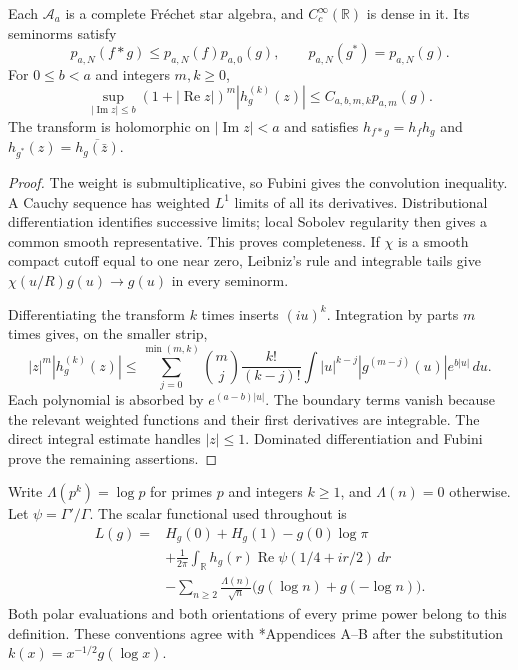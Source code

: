 \begin{lemma}
Each $\mathcal A_a$\label{nwc:lem:tests} is a complete Fr\'echet star algebra, and
$C_c^\infty(\mathbb R)$ is dense in it. Its seminorms satisfy
\[
 p_{a,N}(f*g)\leq p_{a,N}(f)p_{a,0}(g),\qquad
 p_{a,N}(g^*)=p_{a,N}(g).
\]
For $0\leq b<a$ and integers $m,k\geq0$,
\begin{equation}\label{nwc:eq:strip}
 \sup_{|\operatorname{Im}z|\leq b}
 (1+|\operatorname{Re}z|)^m|h_g^{(k)}(z)|
 \leq C_{a,b,m,k}p_{a,m}(g).
\end{equation}
The transform is holomorphic on $|\operatorname{Im}z|<a$ and satisfies
$h_{f*g}=h_fh_g$ and $h_{g^*}(z)=\overline{h_g(\bar z)}$.
\end{lemma}
\begin{proof}
The weight is submultiplicative, so Fubini gives the convolution
inequality. A Cauchy sequence has weighted $L^1$ limits of all its
derivatives. Distributional differentiation identifies successive
limits; local Sobolev regularity then gives a common smooth
representative. This proves completeness.
If $\chi$ is a smooth compact cutoff equal to one near zero,
Leibniz's rule and integrable tails give $\chi(u/R)g(u)\to g(u)$ in
every seminorm.

Differentiating the transform $k$ times inserts $(iu)^k$.
Integration by parts $m$ times gives, on the smaller strip,
\[
 |z|^m|h_g^{(k)}(z)|\leq
 \sum_{j=0}^{\min(m,k)}\binom mj\frac{k!}{(k-j)!}
 \int |u|^{k-j}|g^{(m-j)}(u)|e^{b|u|}\,du.
\]
Each polynomial is absorbed by $e^{(a-b)|u|}$.
The boundary terms vanish because the relevant weighted functions and
their first derivatives are integrable. The direct integral estimate
handles $|z|\leq1$. Dominated differentiation and Fubini prove the
remaining assertions.
\end{proof}

Write $\Lambda(p^k)=\log p$ for primes $p$ and integers $k\geq1$,
and $\Lambda(n)=0$ otherwise. Let $\psi=\Gamma'/\Gamma$.
The scalar functional used throughout is
\begin{equation}\label{nwc:eq:weil}
\begin{aligned}
 L(g)={}&H_g(0)+H_g(1)-g(0)\log\pi\\
 &+\frac1{2\pi}\int_{\mathbb R}h_g(r)
                  \operatorname{Re}\psi(1/4+ir/2)\,dr\\
 &-\sum_{n\geq2}\frac{\Lambda(n)}{\sqrt n}
                 \bigl(g(\log n)+g(-\log n)\bigr).
\end{aligned}
\end{equation}
Both polar evaluations and both orientations of every prime power
belong to this definition. These conventions agree with
\cite{nwc:CC}*{Appendices A--B} after the substitution
$k(x)=x^{-1/2}g(\log x)$.


